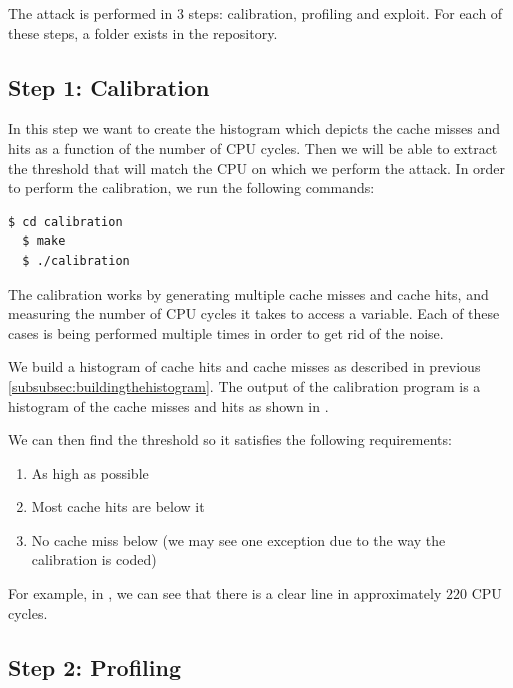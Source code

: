 The attack is performed in 3 steps: calibration, profiling and exploit. For each of these steps, a folder exists in the repository.

\subsection{Step 1: Calibration}
\label{subsec:step1calibration}

In this step we want to create the histogram which depicts the cache misses and hits as a function of the number of CPU cycles. Then we will be able to extract the threshold that will match the CPU on which we perform the attack.
In order to perform the calibration, we run the following commands:

\begin{lstlisting}[language=bash]
  $ cd calibration
  $ make
  $ ./calibration
\end{lstlisting}

The calibration works by generating multiple cache misses and cache hits, and measuring the number of CPU cycles it takes to access a variable. Each of these cases is being performed multiple times in order to get rid of the noise.

\noindent We build a histogram of cache hits and cache misses as described in previous \cref{subsubsec:buildingthehistogram}. The output of the calibration program is a histogram of the cache misses and hits as shown in .

We can then find the threshold so it satisfies the following requirements:
\begin{enumerate}
    \item As high as possible
    \item Most cache hits are below it
    \item No cache miss below (we may see one exception due to the way the calibration is coded)
\end{enumerate}

For example, in , we can see that there is a clear line in approximately $220$ CPU cycles.

\subsection{Step 2: Profiling}
\label{subsec:step2profiling}

